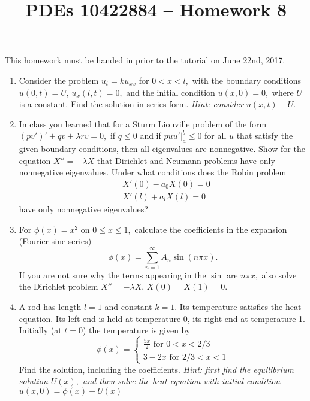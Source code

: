 \documentclass[10pt,a4paper]{article}
\title{PDEs 10422884 – Homework 8}
\date{}
\begin{document}
\maketitle


This homework must be handed in prior to the tutorial on June 22nd,
2017. 
\begin{enumerate}
\item Consider the problem $u_t = k u_{xx}$ for $0 < x < l,$ with the boundary conditions $u(0,t) = U, \, u_x(l,t) = 0,$ and the initial condition $u(x,0) = 0,$ where $U$ is a constant. Find the solution in series form. \emph{Hint: consider $u(x,t) - U.$}
\item In class you learned that for a Sturm Liouville problem of the form $(pv')' + qv + \lambda r v = 0,$ if $q \leq 0$ and if $puu'|^b_a \leq 0$ for all $u$ that satisfy the given boundary conditions, then all eigenvalues are nonnegative. Show for the equation $X'' = - \lambda X$ that Dirichlet and Neumann problems have only nonnegative eigenvalues. Under what conditions does the Robin problem
\begin{align*}
& X'(0) - a_0 X(0) = 0 \\
& X'(l) + a_l X(l) = 0
\end{align*}
 have only nonnegative eigenvalues?
 \item For $\phi(x) = x^2$ on $0 \leq x \leq 1,$ calculate the coefficients in the expansion (Fourier sine series)
 \[ \phi(x) = \sum_{n = 1}^\infty A_n \sin(n \pi x). \]
 If you are not sure why the terms appearing in the $\sin$ are $n \pi x,$ also solve the Dirichlet problem $X'' = -\lambda X, \, X(0) = X(1) = 0.$
 \item A rod has length $l = 1$ and constant $k = 1.$ Its temperature satisfies the heat equation. Its left end is held at temperature 0, its right end at temperature 1. Initially (at $t=0$) the temperature is given by
 \[ \phi(x) = \begin{cases} \frac{5x}{2} \text{ for } 0 < x < 2/3 \\
 3 - 2x \text{ for } 2/3 < x < 1 \end{cases} \] 
 Find the solution, including the coefficients. \emph{Hint: first find the equilibrium solution $U(x),$ and then solve the heat equation with initial condition $u(x,0) = \phi(x) - U(x)$}
\end{enumerate}
\end{document}
